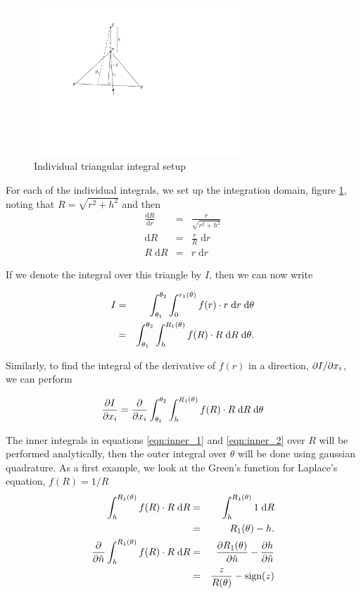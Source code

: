 \begin{figure}[ht]
\begin{center}
	\includegraphics[width=8cm]{img/SemiAnalyticalIntegral.pdf}
	\caption{Individual triangular integral setup}
	\label{fig:semi_analytical_integral}
\end{center}
\end{figure}

For each of the individual integrals, we set up the integration domain, figure \ref{fig:semi_analytical_integral}, noting that $R = \sqrt{r^{2}+h^{2}}$ and then
\begin{eqnarray}
	\frac{\text{d}R}{\text{d}r} & = & \frac{r}{\sqrt{r^{2}+h^{2}}} \nonumber \\
	\text{d}R & = & \frac{r}{R}\;\text{d}r \nonumber \\
	R\;\text{d}R & = & r\;\text{d}r \nonumber
\end{eqnarray}

If we denote the integral over this triangle by $I$, then we can now write

\begin{eqnarray}
	I & = & \int_{\theta_1}^{\theta_2}\int_0^{r_1(\theta)} f(r)\cdot r\;\di{r}\;\di{\theta} \nonumber \\
	    \label{eqn:inner_1} & = & \int_{\theta_1}^{\theta_2}\int_h^{R_1(\theta)} f(R)\cdot R\;\di{R}\;\di{\theta}.
\end{eqnarray}

Similarly, to find the integral of the derivative of $f(r)$ in a direction, $\partial I / \partial x_i$, we can perform

\begin{equation}
	\label{eqn:inner_2}
	\partiald{I}{x_i} = \partiald{}{x_i} \int_{\theta_1}^{\theta_2} \int_h^{R_1(\theta)}f(R)\cdot R \;\di{R}\;\di{\theta}
\end{equation}

The inner integrals in equations \ref{eqn:inner_1} and \ref{eqn:inner_2} over $R$ will be performed analytically, then the outer integral over $\theta$ will be done using gaussian quadrature. As a first example, we look at the Green's function for Laplace's equation, $f(R) = 1 / R$
\begin{eqnarray}
	\int_h^{R_1(\theta)} f(R)\cdot R\;\text{d}R & = & \int_h^{R_1(\theta)}1\;\text{d}R \nonumber \\
	& = & R_1(\theta) - h. \nonumber \\
	\frac{\partial }{\partial \hat{n}}\int_h^{R_1(\theta)} f(R)\cdot R\;\text{d}R & = & \frac{\partial R_1(\theta)}{\partial \hat{n}} -\frac{\partial h}{\partial \hat{n}} \nonumber \\ 
	& = & \frac{z}{R(\theta)}-\text{sign}(z) \nonumber
\end{eqnarray}

